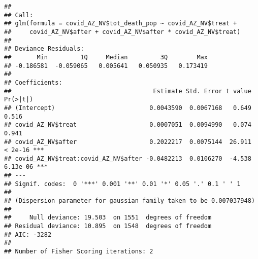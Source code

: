 \documentclass[
]{article}
\newenvironment{Shaded}{\begin{snugshade}}{\end{snugshade}}
\newcommand{\CommentTok}[1]{\textcolor[rgb]{0.56,0.35,0.01}{\textit{#1}}}
\newcommand{\DecValTok}[1]{\textcolor[rgb]{0.00,0.00,0.81}{#1}}
\newcommand{\FunctionTok}[1]{\textcolor[rgb]{0.00,0.00,0.00}{#1}}
\newcommand{\NormalTok}[1]{#1}
\newcommand{\OtherTok}[1]{\textcolor[rgb]{0.56,0.35,0.01}{#1}}
\newcommand{\SpecialCharTok}[1]{\textcolor[rgb]{0.00,0.00,0.00}{#1}}
\newcommand{\StringTok}[1]{\textcolor[rgb]{0.31,0.60,0.02}{#1}}
\begin{document}
\begin{Shaded}
\end{Shaded}

\begin{verbatim}
## 
## Call:
## glm(formula = covid_AZ_NV$tot_death_pop ~ covid_AZ_NV$treat + 
##     covid_AZ_NV$after + covid_AZ_NV$after * covid_AZ_NV$treat)
## 
## Deviance Residuals: 
##       Min         1Q     Median         3Q        Max  
## -0.186581  -0.059065   0.005641   0.050935   0.173419  
## 
## Coefficients:
##                                       Estimate Std. Error t value Pr(>|t|)    
## (Intercept)                          0.0043590  0.0067168   0.649    0.516    
## covid_AZ_NV$treat                    0.0007051  0.0094990   0.074    0.941    
## covid_AZ_NV$after                    0.2022217  0.0075144  26.911  < 2e-16 ***
## covid_AZ_NV$treat:covid_AZ_NV$after -0.0482213  0.0106270  -4.538 6.13e-06 ***
## ---
## Signif. codes:  0 '***' 0.001 '**' 0.01 '*' 0.05 '.' 0.1 ' ' 1
## 
## (Dispersion parameter for gaussian family taken to be 0.007037948)
## 
##     Null deviance: 19.503  on 1551  degrees of freedom
## Residual deviance: 10.895  on 1548  degrees of freedom
## AIC: -3282
## 
## Number of Fisher Scoring iterations: 2
\end{verbatim}
\end{document}
